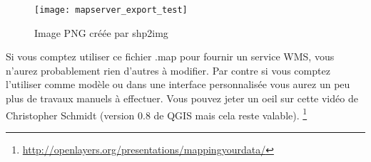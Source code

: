 %

\begin{figure}[ht]
\begin{center}
  \caption{Image PNG créée par shp2img \nixcaption}
  \label{fig:mapserver_export_test}\smallskip
  \texttt{[image: mapserver\_export\_test]}
\end{center}
\end{figure}

Si vous comptez utiliser ce fichier .map pour fournir un service WMS, vous n'aurez probablement rien d'autres à modifier. Par contre si vous comptez l'utiliser comme modèle ou dans une interface personnalisée vous aurez un peu plus de travaux manuels à effectuer. Vous pouvez jeter un oeil sur cette vidéo de Christopher Schmidt (version 0.8 de QGIS mais cela reste valable).
\footnote{\url{http://openlayers.org/presentations/mappingyourdata/}}
